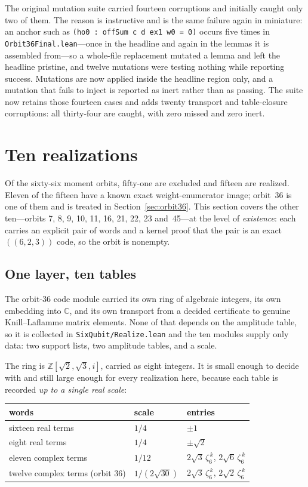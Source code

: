 \documentclass[11pt,a4paper]{article}
\newcommand{\CC}{\mathbb{C}}
\newcommand{\lean}[1]{\texttt{#1}}
\theoremstyle{definition}
\begin{document}
The original mutation suite carried fourteen corruptions and initially caught
only two of them. The reason is instructive and is the same failure again in miniature:
an anchor such as \lean{(ho0 : offSum c d ex1 w0 = 0)} occurs five times in
\lean{Orbit36Final.lean}---once in the headline and again in the lemmas it is
assembled from---so a whole-file replacement mutated a lemma and left the
headline pristine, and twelve mutations were testing nothing while reporting
success. Mutations are now applied inside the headline region only, and a
mutation that fails to inject is reported as inert rather than as passing.  The
suite now retains those fourteen cases and adds twenty transport and table-closure
corruptions: all thirty-four are caught, with zero missed and zero inert.

\section{Ten realizations}
\label{sec:realizations}

Of the sixty-six moment orbits, fifty-one are excluded and fifteen are
realized. Eleven of the fifteen have a known exact weight-enumerator image;
orbit~36 is one of them and is treated in Section~\ref{sec:orbit36}. This
section covers the other ten---orbits 7, 8, 9, 10, 11, 16, 21, 22, 23
and~45---at the level of \emph{existence}: each carries an explicit pair of
words and a kernel proof that the pair is an exact $((6,2,3))$ code, so the
orbit is nonempty.

\subsection{One layer, ten tables}

The orbit-36 code module carried its own ring of algebraic integers, its own
embedding into $\CC$, and its own transport from a decided certificate to
genuine Knill--Laflamme matrix elements. None of that depends on the amplitude
table, so it is collected in \lean{SixQubit/Realize.lean} and the ten modules
supply only data: two support lists, two amplitude tables, and a scale.

The ring is $\mathbb{Z}[\sqrt2,\sqrt3,i]$, carried as eight integers. It is
small enough to decide with and still large enough for every realization here,
because each table is recorded \emph{up to a single real scale}:

\begin{center}
\begin{tabular}{lll}
\toprule
words & scale & entries \\
\midrule
sixteen real terms & $1/4$ & $\pm1$ \\
eight real terms & $1/4$ & $\pm\sqrt2$ \\
eleven complex terms & $1/12$ &
  $2\sqrt3\,\zeta_6^{\,k}$, $2\sqrt6\,\zeta_6^{\,k}$ \\
twelve complex terms (orbit 36) & $1/(2\sqrt{30})$ &
  $2\sqrt3\,\zeta_6^{\,k}$, $2\sqrt2\,\zeta_6^{\,k}$ \\
\bottomrule
\end{tabular}
\end{center}
\end{document}
